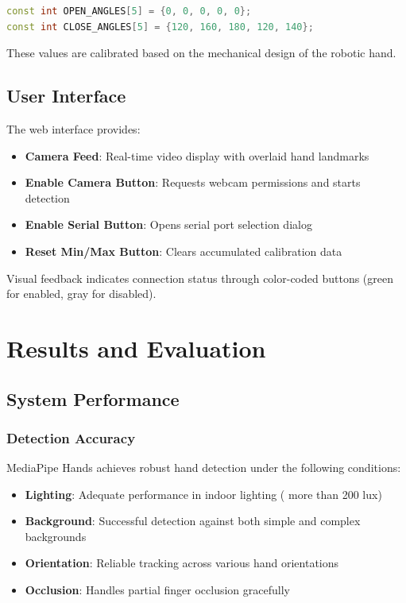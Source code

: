 \documentclass[12pt]{article}
\begin{document}
\begin{lstlisting}[language=C++, caption=Finger-Specific Angle Ranges]
const int OPEN_ANGLES[5] = {0, 0, 0, 0, 0};
const int CLOSE_ANGLES[5] = {120, 160, 180, 120, 140};
\end{lstlisting}

These values are calibrated based on the mechanical design of the robotic hand.

\subsection{User Interface}

The web interface provides:
\begin{itemize}
    \item \textbf{Camera Feed}: Real-time video display with overlaid hand landmarks
    \item \textbf{Enable Camera Button}: Requests webcam permissions and starts detection
    \item \textbf{Enable Serial Button}: Opens serial port selection dialog
    \item \textbf{Reset Min/Max Button}: Clears accumulated calibration data
\end{itemize}

Visual feedback indicates connection status through color-coded buttons (green for enabled, gray for disabled).

\section{Results and Evaluation}

\subsection{System Performance}

\subsubsection{Detection Accuracy}

MediaPipe Hands achieves robust hand detection under the following conditions:
\begin{itemize}
    \item \textbf{Lighting}: Adequate performance in indoor lighting ( more than 200 lux)
    \item \textbf{Background}: Successful detection against both simple and complex backgrounds
    \item \textbf{Orientation}: Reliable tracking across various hand orientations
    \item \textbf{Occlusion}: Handles partial finger occlusion gracefully
\end{itemize}
\end{document}

